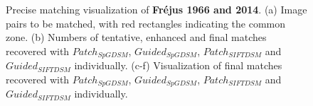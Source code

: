 \begin{figure}[htbp]
\begin{center}
{\begin{minipage}[t]{0.48\linewidth}
			\end{minipage}%
		}
		\caption{Precise matching visualization of \textbf{Fr{\'e}jus 1966 and 2014}. (a) Image pairs to be matched, with red rectangles indicating the common zone. (b) Numbers of tentative, enhanced and final matches recovered with $Patch_{SpGDSM}$, $Guided_{SpGDSM}$, $Patch_{SIFTDSM}$ and $Guided_{SIFTDSM}$ individually. (c-f) Visualization of final matches recovered with $Patch_{SpGDSM}$, $Guided_{SpGDSM}$, $Patch_{SIFTDSM}$ and $Guided_{SIFTDSM}$ individually.}
		\label{MatchVizFrejus1966-2014}
	\end{center}
\end{figure} 


